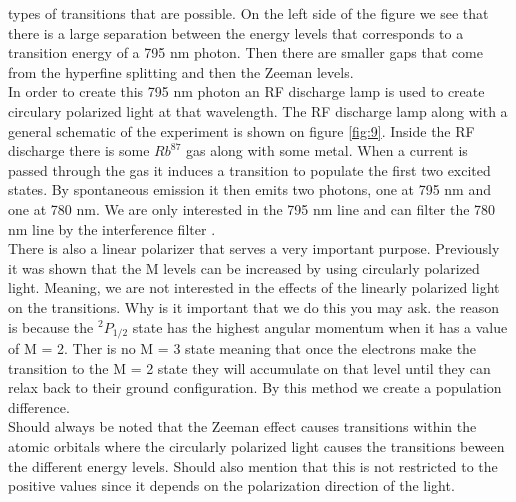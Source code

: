 \documentclass[twocolumn]{article}
\begin{document}
types of transitions that are possible. On the left side of the figure we see 
that there is a large separation between the energy levels that corresponds to 
a transition energy of a 795 nm photon. Then there are smaller gaps that come 
from the hyperfine splitting and then the Zeeman levels.
\\
In order to create this 795 nm photon an RF discharge lamp is used to create 
circulary polarized light at that wavelength. The RF discharge lamp along with 
a general schematic of the experiment is shown on figure \ref{fig:9}. Inside 
the RF discharge there is some $Rb^{87}$ gas along with some metal. When a 
current is passed through the gas it induces a transition to populate the 
first two excited states. By spontaneous emission it then emits two photons, 
one at 795 nm and one at 780 nm. We are only interested in the 795 nm line 
and can filter the 780 nm line by the interference filter \cite{ref:3}.
\\
There is also a linear polarizer that serves a very important purpose. 
Previously it was shown that the M levels can be increased by using circularly 
polarized light. Meaning, we are not interested in the effects of the linearly 
polarized light on the transitions. Why is it important that we do this you 
may ask. the reason is because the $^2P_{1/2}$ state has the highest angular 
momentum when it has a value of M = 2. Ther is no M = 3 state meaning that once 
the electrons make the transition to the M = 2 state they will accumulate on 
that level until they can relax back to their ground configuration. By this 
method we create a population difference.
\\
Should always be noted that the Zeeman effect causes transitions within the 
atomic orbitals where the circularly polarized light causes the transitions 
beween the different energy levels. Should also mention that this is not 
restricted to the positive values since it depends on the polarization 
direction of the light.
\end{document}
